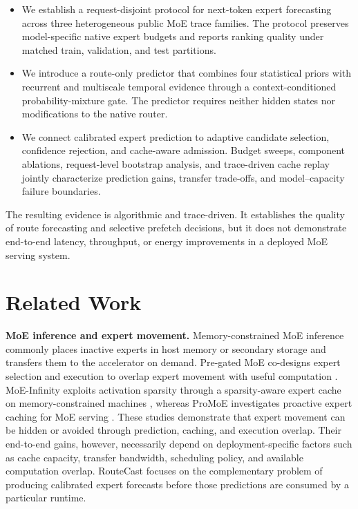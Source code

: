 \documentclass[conference]{IEEEtran}
\begin{document}
\begin{itemize}
    \item We establish a request-disjoint protocol for next-token expert
    forecasting across three heterogeneous public MoE trace families. The
    protocol preserves model-specific native expert budgets and reports
    ranking quality under matched train, validation, and test partitions.

    \item We introduce a route-only predictor that combines four statistical
    priors with recurrent and multiscale temporal evidence through a
    context-conditioned probability-mixture gate. The predictor requires
    neither hidden states nor modifications to the native router.

    \item We connect calibrated expert prediction to adaptive candidate
    selection, confidence rejection, and cache-aware admission. Budget sweeps,
    component ablations, request-level bootstrap analysis, and trace-driven
    cache replay jointly characterize prediction gains, transfer trade-offs,
    and model--capacity failure boundaries.
\end{itemize}

The resulting evidence is algorithmic and trace-driven. It establishes the
quality of route forecasting and selective prefetch decisions, but it does not
demonstrate end-to-end latency, throughput, or energy improvements in a
deployed MoE serving system.


\section{Related Work}

\textbf{MoE inference and expert movement.}
Memory-constrained MoE inference commonly places inactive experts in host
memory or secondary storage and transfers them to the accelerator on demand.
Pre-gated MoE co-designs expert selection and execution to overlap expert
movement with useful computation \cite{pregated}. MoE-Infinity exploits
activation sparsity through a sparsity-aware expert cache on
memory-constrained machines \cite{moeinfinity}, whereas ProMoE investigates
proactive expert caching for MoE serving \cite{promoe}. These studies
demonstrate that expert movement can be hidden or avoided through prediction,
caching, and execution overlap. Their end-to-end gains, however, necessarily
depend on deployment-specific factors such as cache capacity, transfer
bandwidth, scheduling policy, and available computation overlap. RouteCast
focuses on the complementary problem of producing calibrated expert forecasts
before those predictions are consumed by a particular runtime.
\end{document}
